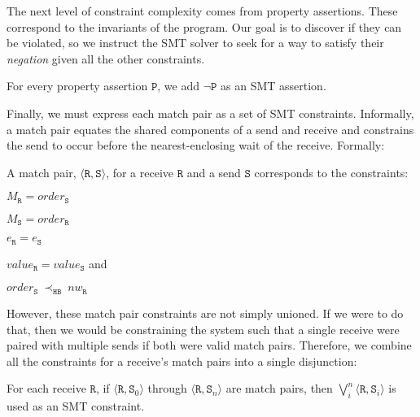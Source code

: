 The next level of constraint complexity comes from property
assertions. These correspond to the invariants of the program. Our
goal is to discover if they can be violated, so we instruct the SMT
solver to seek for a way to satisfy their \emph{negation} given all
the other constraints.

\begin{definition} \label{def:assert}
For every property assertion $\mathtt{P}$, we add $\neg \mathtt{P}$ as
an SMT assertion.
\end{definition}

Finally, we must express each match pair as a set of SMT
constraints. Informally, a match pair equates the shared components of
a send and receive and constrains the send to occur before the
nearest-enclosing wait of the receive. Formally:

\begin{definition} \label{def:match}
A match pair, $\langle\mathtt{R}, \mathtt{S}\rangle$, for a receive
$\mathtt{R}$ and a send $\mathtt{S}$ corresponds to the constraints:
\begin{compactenum}
\item $M_{\mathtt{R}} = \mathit{order}_{\mathtt{S}}$
\item $M_{\mathtt{S}} = \mathit{order}_{\mathtt{R}}$
\item $e_{\mathtt{R}} = e_{\mathtt{S}}$
\item $\mathit{value}_{\mathtt{R}} = \mathit{value}_{\mathtt{S}}$ and
\item $\mathit{order}_{\mathtt{S}}\ \mathrm{\prec_\mathtt{HB}}\ \mathit{nw}_{\mathtt{R}}$
\end{compactenum}
\end{definition}

However, these match pair constraints are not simply unioned. If we
were to do that, then we would be constraining the system such that a
single receive were paired with multiple sends if both were valid
match pairs. Therefore, we combine all the constraints for a receive's
match pairs into a single disjunction:

\begin{definition}
For each receive $\mathtt{R}$, if $\langle\mathtt{R},
\mathtt{S}_0\rangle$ through $\langle\mathtt{R}, \mathtt{S}_n\rangle$
are match pairs, then $\bigvee_{i}^{n} \langle\mathtt{R},
\mathtt{S}_i\rangle$ is used as an SMT constraint.
\end{definition}

